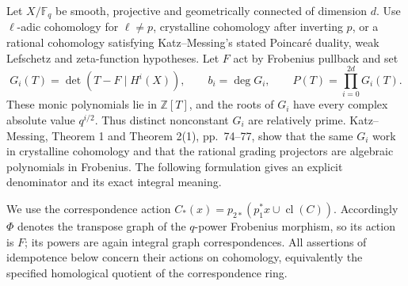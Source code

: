 Let $X/\mathbb F_q$ be smooth, projective and geometrically
connected of dimension $d$.  Use $\ell$-adic cohomology for
$\ell\ne p$, crystalline cohomology after inverting $p$,
or a rational cohomology satisfying Katz--Messing's stated
Poincaré duality, weak Lefschetz and zeta-function hypotheses.
Let $F$ act by Frobenius pullback and set
\[
 G_i(T)=\det(T-F\mid H^i(X)),\qquad b_i=\deg G_i,
 \qquad P(T)=\prod_{i=0}^{2d}G_i(T).
\]
These monic polynomials lie in $\mathbb Z[T]$, and the
roots of $G_i$ have every complex absolute value $q^{i/2}$.
Thus distinct nonconstant $G_i$ are relatively prime.
Katz--Messing, Theorem 1 and Theorem 2(1), pp.~74--77,
show that the same $G_i$ work in crystalline cohomology
and that the rational grading projectors are algebraic
polynomials in Frobenius.  The following formulation gives
an explicit denominator and its exact integral meaning.

We use the correspondence action
$C_*(x)=p_{2*}(p_1^*x\cup\operatorname{cl}(C))$.
Accordingly $\Phi$ denotes the transpose graph of the
$q$-power Frobenius morphism, so its action is $F$;
its powers are again integral graph correspondences.
All assertions of idempotence below concern their actions
on cohomology, equivalently the specified homological
quotient of the correspondence ring.

